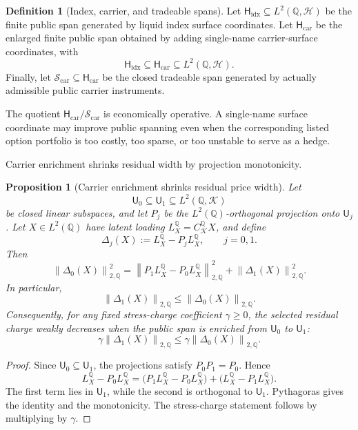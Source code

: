 \documentclass[11pt,a4paper]{amsart}
\theoremstyle{plain}
\newtheorem{proposition}[theorem]{Proposition}
\theoremstyle{definition}
\newtheorem{definition}[theorem]{Definition}
\theoremstyle{remark}
\newcommand{\QQ}{\mathbb{Q}}
\newcommand{\cH}{\mathcal{H}}
\newcommand{\cK}{\mathcal{K}}
\newcommand{\cS}{\mathcal{S}}
\newcommand{\norm}[1]{\left\lVert #1\right\rVert}
\begin{document}
\begin{definition}[Index, carrier, and tradeable spans]\label{def:carrier-enriched-spans}
Let \(\mathsf H_{\mathrm{idx}}\subseteq L^2(\QQ,\cH)\) be the finite public span generated by liquid index
surface coordinates.  Let \(\mathsf H_{\mathrm{car}}\) be the enlarged finite public span obtained by
adding single-name carrier-surface coordinates, with
\[
        \mathsf H_{\mathrm{idx}}
        \subseteq
        \mathsf H_{\mathrm{car}}
        \subseteq
        L^2(\QQ,\cH).
\]
Finally, let \(\cS_{\mathrm{car}}\subseteq \mathsf H_{\mathrm{car}}\) be the closed tradeable span generated
by actually admissible public carrier instruments.
\end{definition}

The quotient \(\mathsf H_{\mathrm{car}}/\cS_{\mathrm{car}}\) is economically operative.  A
single-name surface coordinate may improve public spanning even when the corresponding listed
option portfolio is too costly, too sparse, or too unstable to serve as a hedge.

Carrier enrichment shrinks residual width by projection monotonicity.

\begin{proposition}[Carrier enrichment shrinks residual price width]\label{prop:carrier-enrichment-shrinks}
Let
\[
        \mathsf U_0\subseteq\mathsf U_1\subseteq L^2(\QQ,\cK)
\]
be closed linear subspaces, and let \(P_j\) be the \(L^2(\QQ)\)-orthogonal projection onto
\(\mathsf U_j\).  Let \(X\in L^2(\QQ)\) have latent loading \(L_X^\QQ=C_{\cK}^{\QQ}X\), and define
\[
        \Delta_j(X):=L_X^\QQ-P_jL_X^\QQ,
        \qquad j=0,1.
\]
Then
\[
        \norm{\Delta_0(X)}_{2,\QQ}^{2}
        =
        \norm{P_1L_X^\QQ-P_0L_X^\QQ}_{2,\QQ}^{2}
        +
        \norm{\Delta_1(X)}_{2,\QQ}^{2}.
\]
In particular,
\[
        \norm{\Delta_1(X)}_{2,\QQ}
        \le
        \norm{\Delta_0(X)}_{2,\QQ}.
\]
Consequently, for any fixed stress-charge coefficient \(\gamma\ge0\), the selected residual charge
weakly decreases when the public span is enriched from \(\mathsf U_0\) to \(\mathsf U_1\):
\[
        \gamma\norm{\Delta_1(X)}_{2,\QQ}
        \le
        \gamma\norm{\Delta_0(X)}_{2,\QQ}.
\]
\end{proposition}

\begin{proof}
Since \(\mathsf U_0\subseteq\mathsf U_1\), the projections satisfy \(P_0P_1=P_0\).  Hence
\[
        L_X^\QQ-P_0L_X^\QQ
        =
        \bigl(P_1L_X^\QQ-P_0L_X^\QQ\bigr)
        +
        \bigl(L_X^\QQ-P_1L_X^\QQ\bigr).
\]
The first term lies in \(\mathsf U_1\), while the second is orthogonal to \(\mathsf U_1\).
Pythagoras gives the identity and the monotonicity.  The stress-charge statement follows by
multiplying by \(\gamma\).
\end{proof}
\end{document}
